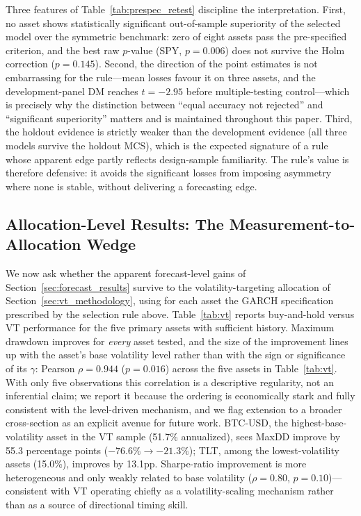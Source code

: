 Three features of Table~\ref{tab:prespec_retest} discipline the interpretation. First, no asset shows statistically significant out-of-sample superiority of the selected model over the symmetric benchmark: zero of eight assets pass the pre-specified criterion, and the best raw $p$-value (SPY, $p=0.006$) does not survive the Holm correction ($p=0.145$). Second, the direction of the point estimates is not embarrassing for the rule---mean losses favour it on three assets, and the development-panel DM reaches $t=-2.95$ before multiple-testing control---which is precisely why the distinction between ``equal accuracy not rejected'' and ``significant superiority'' matters and is maintained throughout this paper. Third, the holdout evidence is strictly weaker than the development evidence (all three models survive the holdout MCS), which is the expected signature of a rule whose apparent edge partly reflects design-sample familiarity. The rule's value is therefore defensive: it avoids the significant losses from imposing asymmetry where none is stable, without delivering a forecasting edge.

\subsection{Allocation-Level Results: The Measurement-to-Allocation Wedge}
\label{sec:allocation_results}

We now ask whether the apparent forecast-level gains of Section~\ref{sec:forecast_results} survive to the volatility-targeting allocation of Section~\ref{sec:vt_methodology}, using for each asset the GARCH specification prescribed by the selection rule above. Table~\ref{tab:vt} reports buy-and-hold versus VT performance for the five primary assets with sufficient history.%
Maximum drawdown improves for \emph{every} asset tested, and the size of the improvement lines up with the asset's base volatility level rather than with the sign or significance of its $\gamma$: Pearson $\rho=0.944$ ($p=0.016$) across the five assets in Table~\ref{tab:vt}. With only five observations this correlation is a descriptive regularity, not an inferential claim; we report it because the ordering is economically stark and fully consistent with the level-driven mechanism, and we flag extension to a broader cross-section as an explicit avenue for future work. BTC-USD, the highest-base-volatility asset in the VT sample (51.7\% annualized), sees MaxDD improve by 55.3 percentage points ($-76.6\%\to-21.3\%$); TLT, among the lowest-volatility assets (15.0\%), improves by 13.1pp. Sharpe-ratio improvement is more heterogeneous and only weakly related to base volatility ($\rho=0.80$, $p=0.10$)---consistent with VT operating chiefly as a volatility-scaling mechanism rather than as a source of directional timing skill.

